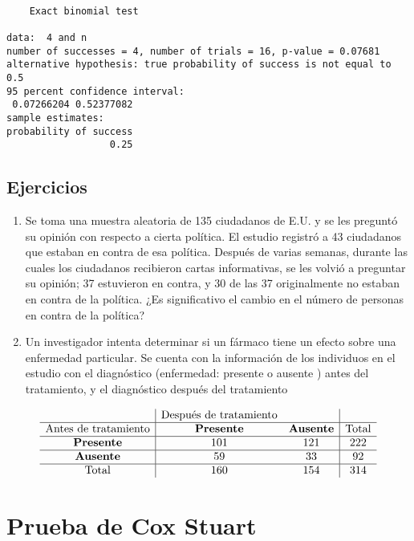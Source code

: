 \documentclass[
  a4paper,
  oneside,
  openany]{book}
\begin{document}
\begin{verbatim}

    Exact binomial test

data:  4 and n
number of successes = 4, number of trials = 16, p-value = 0.07681
alternative hypothesis: true probability of success is not equal to 0.5
95 percent confidence interval:
 0.07266204 0.52377082
sample estimates:
probability of success 
                  0.25 
\end{verbatim}

\hypertarget{ejercicios-3}{%
\section{Ejercicios}\label{ejercicios-3}}

\begin{enumerate}
\def\labelenumi{\arabic{enumi}.}
\item
  Se toma una muestra aleatoria de 135 ciudadanos de E.U. y se les preguntó su opinión con respecto a cierta política. El estudio registró a 43 ciudadanos que estaban en contra de esa política. Después de varias semanas, durante las cuales los ciudadanos recibieron cartas informativas, se les volvió a preguntar su opinión; 37 estuvieron en contra, y 30 de las 37 originalmente no estaban en contra de la política. ¿Es significativo el cambio en el número de personas en contra de la política?
\item
  Un investigador intenta determinar si un fármaco tiene un efecto sobre una enfermedad particular. Se cuenta con la información de los individuos en el estudio con el diagnóstico (enfermedad: presente o ausente ) antes del tratamiento, y el diagnóstico después del tratamiento
\end{enumerate}

\[
\begin{array}{c| c c|c} 
&\mbox{Después de tratamiento}&&\\
\hline
\mbox{Antes de tratamiento}& \textbf{Presente} & \textbf{Ausente} & \mbox{Total} \\  
\hline
\textbf{Presente} & 101& 121&222\\
\hline
\textbf{Ausente} & 59& 33&92\\
\hline
\mbox{Total}&160&154&314\\
\end{array}
\]

\hypertarget{prueba-de-cox-stuart}{%
\chapter{Prueba de Cox Stuart}\label{prueba-de-cox-stuart}}
\end{document}
